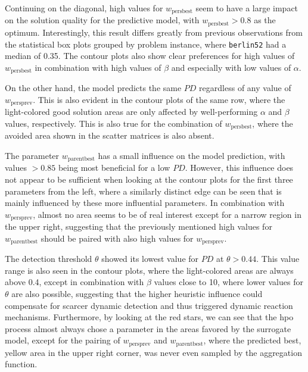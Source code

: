Continuing on the diagonal, high values for $w_{\text{persbest}}$ seem to have a large impact on the solution quality for the predictive model, with $w_{\text{persbest}} > 0.8$ as the optimum. Interestingly, this result differs greatly from previous observations from the statistical box plots grouped by problem instance, where \texttt{berlin52} had a median of 0.35. The contour plots also show clear preferences for high values of $w_{\text{persbest}}$ in combination with high values of $\beta$ and especially with low values of $\alpha$.

On the other hand, the model predicts the same $PD$ regardless of any value of $w_{\text{persprev}}$. This is also evident in the contour plots of the same row, where the light-colored good solution areas are only affected by well-performing $\alpha$ and $\beta$ values, respectively. This is also true for the combination of $w_{\text{persbest}}$, where the avoided area shown in the scatter matrices is also absent.

The parameter $w_{\text{parentbest}}$ has a small influence on the model prediction, with values $ > 0.85$ being most beneficial for a low $PD$. However, this influence does not appear to be sufficient when looking at the contour plots for the first three parameters from the left, where a similarly distinct edge can be seen that is mainly influenced by these more influential parameters. In combination with $w_{\text{persprev}}$, almost no area seems to be of real interest except for a narrow region in the upper right, suggesting that the previously mentioned high values for $w_{\text{parentbest}}$ should be paired with also high values for $w_{\text{persprev}}$.

The detection threshold $\theta$ showed its lowest value for $PD$ at $\theta > 0.44$. This value range is also seen in the contour plots, where the light-colored areas are always above 0.4, except in combination with $\beta$ values close to 10, where lower values for $\theta$ are also possible, suggesting that the higher heuristic influence could compensate for scarcer dynamic detection and thus triggered dynamic reaction mechanisms. 
Furthermore, by looking at the red stars, we can see that the \gls{hpo} process almost always chose a parameter in the areas favored by the surrogate model, except for the pairing of $w_{\text{persprev}}$ and $w_{\text{parentbest}}$, where the predicted best, yellow area in the upper right corner, was never even sampled by the aggregation function.

